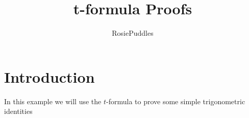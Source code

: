 \documentclass{article}
\title{t-formula Proofs}
\date{}
\author{RosiePuddles}
\begin{document}
\maketitle
\section{Introduction}In this example we will use the $t$-formula to prove some simple trigonometric identities 
\end{document}
